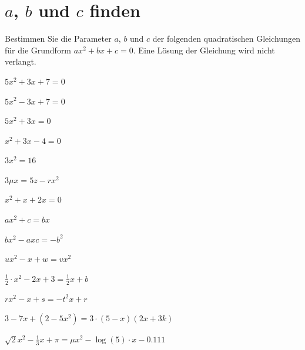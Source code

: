 \section{$a$, $b$ und $c$ finden}
Bestimmen Sie die Parameter $a$, $b$ und $c$ der folgenden quadratischen Gleichungen für die Grundform $ax^2 +bx +c = 0$. Eine Lösung der Gleichung wird nicht verlangt.
\begin{bbwAufgabenBlock}
\item $5x^2+3x+7 = 0$

\item $5x^2-3x+7 = 0$

\item $5x^2 + 3x = 0$

\item $ x^2+3x-4= 0$

\item $3x^2 =16 $

\item $3\mu x = 5z - rx^2 $

\item $ x^2+x+2x= 0$

\item $ax^2 + c = bx $

\item $bx^2 -axc = -b^2$

\item $ux^2 -x+w = vx^2 $

\item $\frac12\cdot{}x^2 -2x+3 = \frac12 x + b$

\item $rx^2-x+s = -t^2x +r$

\item $ 3-7x+(2-5x^2) = 3\cdot{}(5-x)(2x+3k) $

\item $ \sqrt2x^2 - \frac13x + \pi = \mu x^2 - \log(5)\cdot{}x - 0.111 $

\end{bbwAufgabenBlock}
\newpage
